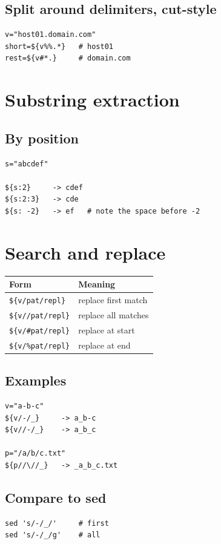 \documentclass[11pt]{article}
\begin{document}
\subsection{Split around delimiters, cut-style}
\begin{lstlisting}
v="host01.domain.com"
short=${v%%.*}   # host01
rest=${v#*.}     # domain.com
\end{lstlisting}

\section{Substring extraction}
\subsection{By position}
\begin{lstlisting}
s="abcdef"

${s:2}     -> cdef
${s:2:3}   -> cde
${s: -2}   -> ef   # note the space before -2
\end{lstlisting}

\section{Search and replace}
\begin{longtable}{ll}
\toprule
Form & Meaning \\
\midrule
\texttt{\$\{v/pat/repl\}}    & replace first match \\
\texttt{\$\{v//pat/repl\}}   & replace all matches \\
\texttt{\$\{v/\#pat/repl\}}  & replace at start \\
\texttt{\$\{v/\%pat/repl\}}  & replace at end \\
\bottomrule
\end{longtable}

\subsection{Examples}
\begin{lstlisting}
v="a-b-c"
${v/-/_}     -> a_b-c
${v//-/_}    -> a_b_c

p="/a/b/c.txt"
${p//\//_}   -> _a_b_c.txt
\end{lstlisting}

\subsection{Compare to sed}
\begin{lstlisting}
sed 's/-/_/'     # first
sed 's/-/_/g'    # all
\end{lstlisting}
\end{document}
